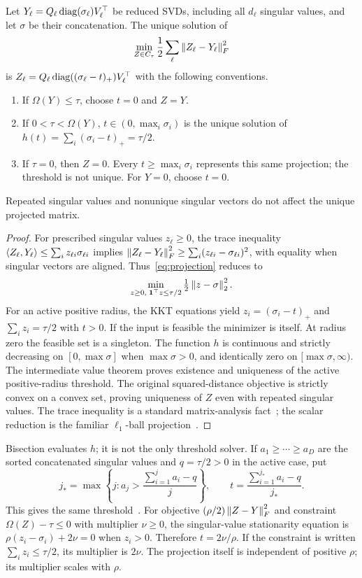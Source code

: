 \begin{proposition}\label{prop:projection}
Let $Y_\ell=Q_\ell\operatorname{diag}(\sigma_\ell)V_\ell^\top$ be reduced SVDs, including all $d_\ell$ singular values, and let $\sigma$ be their concatenation. The unique solution of
\begin{equation}\label{eq:projection}
 \min_{Z\in C_\tau}\frac12\sum_\ell\left\lVert Z_\ell-Y_\ell\right\rVert_F^2
\end{equation}
is $Z_\ell=Q_\ell\operatorname{diag}((\sigma_\ell-t)_+)V_\ell^\top$ with the following conventions.
\begin{enumerate}
\item If $\Omega(Y)\le\tau$, choose $t=0$ and $Z=Y$.
\item If $0<\tau<\Omega(Y)$, $t\in(0,\max_i\sigma_i)$ is the unique solution of $h(t)=\sum_i(\sigma_i-t)_+=\tau/2$.
\item If $\tau=0$, then $Z=0$. Every $t\ge\max_i\sigma_i$ represents this same projection; the threshold is not unique. For $Y=0$, choose $t=0$.
\end{enumerate}
Repeated singular values and nonunique singular vectors do not affect the unique projected matrix.
\end{proposition}
\begin{proof}
For prescribed singular values $z_\ell\ge0$, the trace inequality $\left\langle Z_\ell,Y_\ell\right\rangle\le\sum_i z_{\ell i}\sigma_{\ell i}$ implies
$\left\lVert Z_\ell-Y_\ell\right\rVert_F^2\ge\sum_i(z_{\ell i}-\sigma_{\ell i})^2$, with equality when singular vectors are aligned. Thus~\eqref{eq:projection} reduces to
\[
 \min_{z\ge0,\;\boldsymbol1^\top z\le\tau/2}\tfrac12\left\lVert z-\sigma\right\rVert_2^2.
\]
For an active positive radius, the KKT equations yield $z_i=(\sigma_i-t)_+$ and $\sum_i z_i=\tau/2$ with $t>0$. If the input is feasible the minimizer is itself. At radius zero the feasible set is a singleton. The function $h$ is continuous and strictly decreasing on $[0,\max\sigma]$ when $\max\sigma>0$, and identically zero on $[\max\sigma,\infty)$. The intermediate value theorem proves existence and uniqueness of the active positive-radius threshold. The original squared-distance objective is strictly convex on a convex set, proving uniqueness of $Z$ even with repeated singular values. The trace inequality is a standard matrix-analysis fact~\cite{Bhatia1997}; the scalar reduction is the familiar $\ell_1$-ball projection~\cite{Duchi2008L1proj}.
\end{proof}

Bisection evaluates $h$; it is not the only threshold solver. If $a_1\ge\cdots\ge a_D$ are the sorted concatenated singular values and $q=\tau/2>0$ in the active case, put
\[
 j_* =\max\left\{j:a_j>\frac{\sum_{i=1}^j a_i-q}{j}\right\},\qquad
 t=\frac{\sum_{i=1}^{j_*}a_i-q}{j_*}.
\]
This gives the same threshold~\cite{Duchi2008L1proj}. For objective $(\rho/2)\left\lVert Z-Y\right\rVert_F^2$ and constraint $\Omega(Z)-\tau\le0$ with multiplier $\nu\ge0$, the singular-value stationarity equation is $\rho(z_i-\sigma_i)+2\nu=0$ when $z_i>0$. Therefore $t=2\nu/\rho$. If the constraint is written $\sum_i z_i\le\tau/2$, its multiplier is $2\nu$. The projection itself is independent of positive $\rho$; its multiplier scales with $\rho$.

